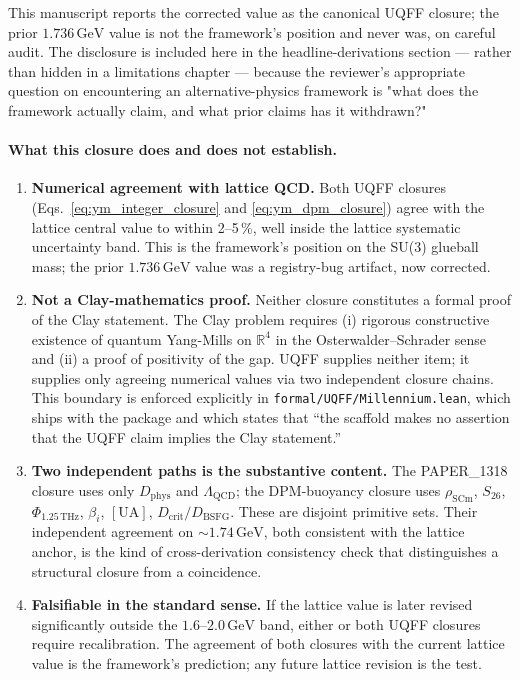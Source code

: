 This manuscript reports the corrected value as the canonical UQFF
closure; the prior $1.736\,\mathrm{GeV}$ value is not the framework's
position and never was, on careful audit. The disclosure is
included here in the headline-derivations section --- rather than
hidden in a limitations chapter --- because the reviewer's
appropriate question on encountering an alternative-physics
framework is "what does the framework actually claim, and what
prior claims has it withdrawn?"

\paragraph{What this closure does and does not establish.}

\begin{enumerate}
  \item \textbf{Numerical agreement with lattice QCD.} Both UQFF
        closures (Eqs.~\ref{eq:ym_integer_closure} and
        \ref{eq:ym_dpm_closure}) agree with the lattice
        central value to within 2--5\,\%, well inside the lattice
        systematic uncertainty band. This is the framework's position
        on the SU(3) glueball mass; the prior $1.736\,\mathrm{GeV}$
        value was a registry-bug artifact, now corrected.
  \item \textbf{Not a Clay-mathematics proof.} Neither closure
        constitutes a formal proof of the Clay statement. The Clay
        problem requires (i) rigorous constructive existence of
        quantum Yang-Mills on $\mathbb{R}^4$ in the
        Osterwalder--Schrader sense and (ii) a proof of positivity of
        the gap. UQFF supplies neither item; it supplies only
        agreeing numerical values via two independent closure chains.
        This boundary is enforced explicitly in
        \texttt{formal/UQFF/Millennium.lean}, which ships with the
        package and which states that ``the scaffold makes no
        assertion that the UQFF claim implies the Clay statement.''
  \item \textbf{Two independent paths is the substantive content.}
        The PAPER\_1318 closure uses only $D_{\text{phys}}$ and
        $\Lambda_{\text{QCD}}$; the DPM-buoyancy closure uses
        $\rho_{\text{SCm}}$, $S_{26}$, $\Phi_{1.25\,\text{THz}}$,
        $\beta_i$, $[\mathrm{UA}]$, $D_{\text{crit}}/D_{\text{BSFG}}$.
        These are disjoint primitive sets. Their independent
        agreement on $\sim 1.74\,\mathrm{GeV}$, both consistent with
        the lattice anchor, is the kind of cross-derivation
        consistency check that distinguishes a structural closure
        from a coincidence.
  \item \textbf{Falsifiable in the standard sense.} If the lattice
        value is later revised significantly outside the
        $1.6$--$2.0\,\mathrm{GeV}$ band, either or both UQFF closures
        require recalibration. The agreement of both closures with
        the current lattice value is the framework's prediction; any
        future lattice revision is the test.
\end{enumerate}

